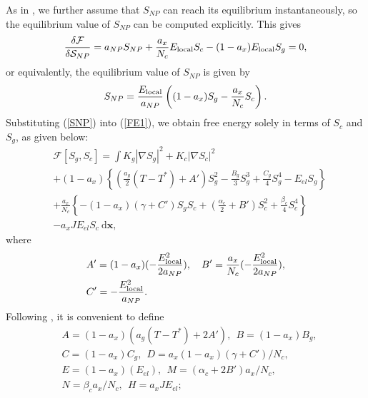 \documentclass[reprint,amsfonts,amsmath,amssymb,aps,pre,floatfix,10pt]{revtex4-1}
\newcommand\dd{\mathrm{d}}
\newcommand\x{\mathbf{x}}
\begin{document}
 As in \cite{lopatina2009theory_13}, we further assume that $S_{NP}$ can reach its equilibrium instantaneously, so the equilibrium value of $S_{NP}$ can be computed explicitly. This gives
\begin{equation}
\frac{\delta \mathcal{F}}{\delta \mathcal{S}_{NP}} = a_{NP} S_{NP} + \frac{a_x}{N_c} E_{\rm local} S_c - (1 - a_x) E_{\rm local} S_g = 0,
\end{equation}
or equivalently, the equilibrium value of $S_{NP}$ is given by
\begin{equation}\label{SNP}
S_{NP} =  \frac{E_{\rm local}}{a_{NP}} \left( (1 - a_x) S_g - \frac{a_x}{ N_c } S_c \right).
\end{equation}
Substituting (\ref{SNP}) into (\ref{FE1}), we obtain free energy solely in terms of $S_c$ and $S_g$, as given below:
\begin{equation}
  \begin{aligned}
  & \mathcal{F}[S_g, S_c] = \int K_g\left|\nabla S_g\right|^2 +K_c\left|\nabla S_c\right|^2 \\
  & +\left(1-a_x\right)\left\{ (\tfrac{a_g}{2}\left(T-T^*\right) + A') S_g^2-\tfrac{B_g}{3} S_g^3+\tfrac{C_g}{4} S_g^4-E_{e l} S_g\right\} \\ &+\tfrac{a_x}{N_c}\left\{-\left(1-a_x\right) (\gamma + C') S_g S_c + (\tfrac{\alpha_c}{2} + B') S_c^2+\tfrac{\beta_c}{4} S_c^4\right\} \\
  & -a_x J E_{e l} S_c ~ \dd \x,
  \end{aligned}
\end{equation}
where
\begin{equation}
  \begin{aligned}
    & A' = (1 - a_x) (- \frac{E_{\rm local}^2}{2 a_{NP}}), \quad B' =  \frac{a_x}{N_c} (- \frac{E_{\rm local}^2}{2 a_{NP}}), \\
    & C' = - \frac{E_{\rm local}^2}{a_{NP}}. \\
  \end{aligned}
\end{equation} %
Following \cite{patranabish2019one_37}, it is convenient to define
\begin{equation}
  \begin{aligned}
  & A = (1 -  a_x) ( a_g (T - T^*) + 2 A'),~~ B = (1 -  a_x) B_g,\\
  & C = (1 -  a_x) C_g,~~ D = a_x  (1 -  a_x) (\gamma + C') / N_c,  \\
  & E = (1 -  a_x) (E_{el}), ~~ M = (\alpha_c + 2 B') a_x / N_c, \\
  & N = \beta_c a_x / N_c, ~~ H =  a_x J E_{el};  \\
  \end{aligned}
\end{equation} 
\end{document}

